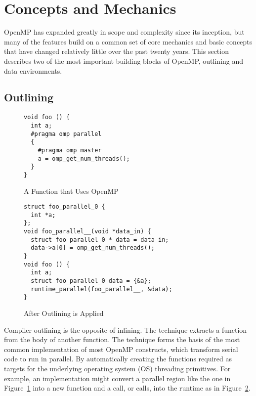 \section{Concepts and Mechanics}
\label{sec:concepts}

OpenMP has expanded greatly in scope and complexity since its inception, but
many of the features build on a common set of core mechanics and basic concepts
that have changed relatively little over the past twenty years.  This section
describes two of the most important building blocks of OpenMP, outlining and
data environments.

\subsection{Outlining}
\label{sub:outlining}

\begin{figure}
\begin{verbatim}
void foo () {
  int a;
  #pragma omp parallel
  {
    #pragma omp master
    a = omp_get_num_threads();
  }
}
\end{verbatim}
\caption{A Function that Uses OpenMP}
\label{fig:outline-before}
\end{figure}

\begin{figure}
\begin{verbatim}
struct foo_parallel_0 {
  int *a;
};
void foo_parallel__(void *data_in) {
  struct foo_parallel_0 * data = data_in;
  data->a[0] = omp_get_num_threads();
}
void foo () {
  int a;
  struct foo_parallel_0 data = {&a};
  runtime_parallel(foo_parallel__, &data);
}
\end{verbatim}
\caption{After Outlining is Applied}
\label{fig:outline-after}
\end{figure}

Compiler outlining is the opposite of inlining. The technique extracts a 
function from the body of another function. The technique forms the basis 
of the most common implementation of most OpenMP constructs, which transform
serial code to run in parallel. By automatically creating the 
functions required as targets for the underlying operating system (OS) 
threading primitives. For example, an implementation might convert a 
parallel region like the one in Figure~\ref{fig:outline-before} into a 
new function and a call, or calls, into the runtime as in 
Figure~\ref{fig:outline-after}.

